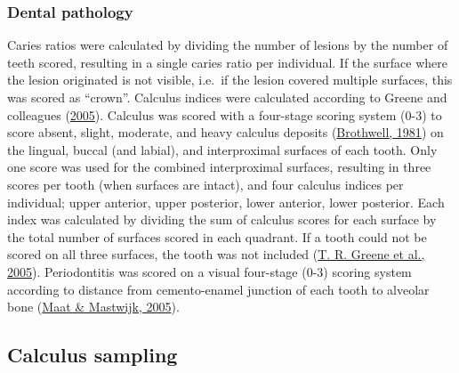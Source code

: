 \documentclass[
  letterpaper,
]{book}
\begin{document}
\hypertarget{dental-pathology}{%
\subsubsection{Dental pathology}\label{dental-pathology}}

Caries ratios were calculated by dividing the number of lesions by the
number of teeth scored, resulting in a single caries ratio per
individual. If the surface where the lesion originated is not visible,
i.e.~if the lesion covered multiple surfaces, this was scored as
``crown''. Calculus indices were calculated according to Greene and
colleagues
(\protect\hyperlink{ref-greeneQuantifyingCalculus2005}{2005}). Calculus
was scored with a four-stage scoring system (0-3) to score absent,
slight, moderate, and heavy calculus deposits
(\protect\hyperlink{ref-brothwellDiggingBones1981}{Brothwell, 1981}) on
the lingual, buccal (and labial), and interproximal surfaces of each
tooth. Only one score was used for the combined interproximal surfaces,
resulting in three scores per tooth (when surfaces are intact), and four
calculus indices per individual; upper anterior, upper posterior, lower
anterior, lower posterior. Each index was calculated by dividing the sum
of calculus scores for each surface by the total number of surfaces
scored in each quadrant. If a tooth could not be scored on all three
surfaces, the tooth was not included
(\protect\hyperlink{ref-greeneQuantifyingCalculus2005}{T. R. Greene et
al., 2005}). Periodontitis was scored on a visual four-stage (0-3)
scoring system according to distance from cemento-enamel junction of
each tooth to alveolar bone
(\protect\hyperlink{ref-maatManualPhysical2005}{Maat \& Mastwijk,
2005}).

\hypertarget{calculus-sampling}{%
\subsection{Calculus sampling}\label{calculus-sampling}}
\end{document}
